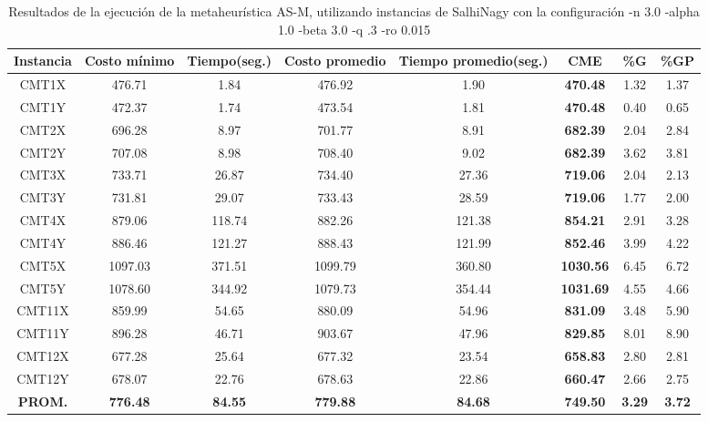 \begin{table}[h]
\caption{Resultados de la ejecución de la metaheurística AS-M, utilizando instancias de SalhiNagy con la configuración -n 3.0 -alpha 1.0 -beta 3.0 -q .3 -ro 0.015}
\centering
\small
\begin{tabular}{c c c c c c c c}
\hline\hline
Instancia & Costo mínimo & Tiempo(seg.) & Costo promedio & Tiempo promedio(seg.) & CME & \%G & \%GP \\ [0.5ex]
\hline
CMT1X & 476.71 & 1.84 & 
476.92 & 1.90 & \bf{470.48} & 
1.32 & 1.37\\CMT1Y & 472.37 & 1.74 & 
473.54 & 1.81 & \bf{470.48} & 
0.40 & 0.65\\CMT2X & 696.28 & 8.97 & 
701.77 & 8.91 & \bf{682.39} & 
2.04 & 2.84\\CMT2Y & 707.08 & 8.98 & 
708.40 & 9.02 & \bf{682.39} & 
3.62 & 3.81\\CMT3X & 733.71 & 26.87 & 
734.40 & 27.36 & \bf{719.06} & 
2.04 & 2.13\\CMT3Y & 731.81 & 29.07 & 
733.43 & 28.59 & \bf{719.06} & 
1.77 & 2.00\\CMT4X & 879.06 & 118.74 & 
882.26 & 121.38 & \bf{854.21} & 
2.91 & 3.28\\CMT4Y & 886.46 & 121.27 & 
888.43 & 121.99 & \bf{852.46} & 
3.99 & 4.22\\CMT5X & 1097.03 & 371.51 & 
1099.79 & 360.80 & \bf{1030.56} & 
6.45 & 6.72\\CMT5Y & 1078.60 & 344.92 & 
1079.73 & 354.44 & \bf{1031.69} & 
4.55 & 4.66\\CMT11X & 859.99 & 54.65 & 
880.09 & 54.96 & \bf{831.09} & 
3.48 & 5.90\\CMT11Y & 896.28 & 46.71 & 
903.67 & 47.96 & \bf{829.85} & 
8.01 & 8.90\\CMT12X & 677.28 & 25.64 & 
677.32 & 23.54 & \bf{658.83} & 
2.80 & 2.81\\CMT12Y & 678.07 & 22.76 & 
678.63 & 22.86 & \bf{660.47} & 
2.66 & 2.75\\\bf{PROM.} & 
\bf{776.48} & \bf{84.55} & \bf{779.88} & \bf{84.68} & \bf{749.50} & \bf{3.29} & \bf{3.72}\\[1ex]\hline
\end{tabular}
\label{table:nonlin}
\end{table}
